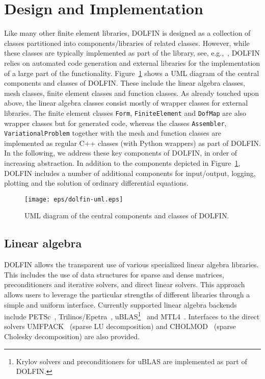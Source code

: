 \documentclass[acmtoms]{acmtrans2m}
\newcommand{\emp}[1]{\texttt{#1}}
\newcommand{\dolfin}{DOLFIN}
\begin{document}
\section{Design and Implementation}
\label{sec:implementation}

Like many other finite element libraries, \dolfin{} is designed as a
collection of classes partitioned into components/libraries of related
classes. However, while these classes are typically implemented as
part of the library, see, e.g.,~, \dolfin{}
relies on automated code generation and external libraries for the
implementation of a large part of the functionality.
Figure~\ref{fig:uml} shows a UML diagram of the central components
and classes of \dolfin{}. These include the linear algebra classes,
mesh classes, finite element classes and function classes. As already
touched upon above, the linear algebra classes consist mostly of
wrapper classes for external libraries. The finite element classes
\emp{Form}, \emp{FiniteElement} and \emp{DofMap} are also wrapper
classes but for generated code, whereas the classes \emp{Assembler},
\emp{VariationalProblem} together with the mesh and function classes
are implemented as regular C++ classes (with Python wrappers) as part
of \dolfin{}.  In the
following, we address these key components of \dolfin{}, in order of
increasing abstraction. In addition to the components depicted in
Figure~\ref{fig:uml}, \dolfin{} includes a number of additional
components for input/output, logging, plotting and the solution of
ordinary differential equations.
\begin{figure}
  \begin{center}
    \texttt{[image: eps/dolfin-uml.eps]}
    \caption{UML diagram of the central components and classes of \dolfin{}.}
    \label{fig:uml}
  \end{center}
\end{figure}
\subsection{Linear algebra}
\label{sec:la}
\dolfin{} allows the transparent use of various specialized
linear algebra libraries. This includes the use of data structures for
sparse and dense matrices, preconditioners and iterative solvers, and
direct linear solvers. This approach allows users to leverage the
particular strengths of different libraries through a simple and
uniform interface. Currently supported linear algebra backends include
PETSc~\cite{petsc:www}, Trilinos/Epetra~\cite{trilinos:2005},
uBLAS\footnote{Krylov solvers and preconditioners for uBLAS are
  implemented as part of \dolfin{}.}~\cite{ublas:www} and
MTL4~\cite{mtl4:www}. Interfaces to the direct solvers
UMFPACK~\cite{davis:2004} (sparse LU decomposition) and
CHOLMOD~\cite{chen:2008} (sparse Cholesky decomposition) are also
provided.
\end{document}

